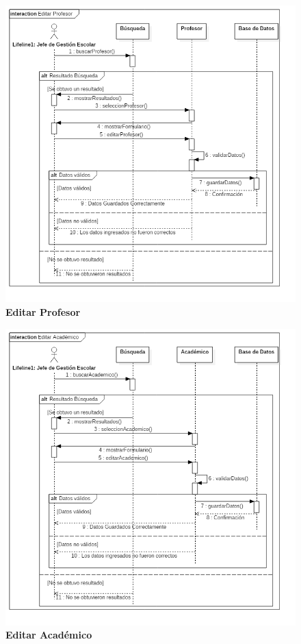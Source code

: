 \begin{figure}[H]
  \centering
    \includegraphics[scale=.7,angle=0]{project/Secuencia/editar_profesor.png}
  \caption{\textbf{Editar Profesor}}
\end{figure}
\begin{figure}[H]
  \centering
    \includegraphics[scale=.7,angle=0]{project/Secuencia/editar_academico.png}
  \caption{\textbf{Editar Académico}}
\end{figure}

